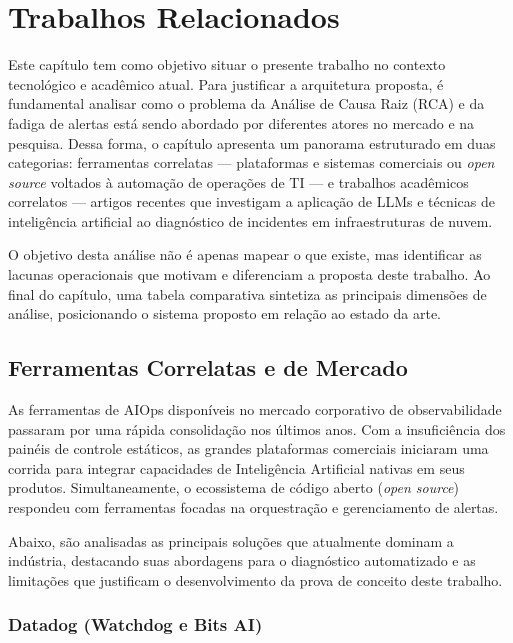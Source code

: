 \chapter{Trabalhos Relacionados}
\label{chap:trabalhos_relacionados}

Este capítulo tem como objetivo situar o presente trabalho no contexto tecnológico e acadêmico atual. Para justificar a arquitetura proposta, é fundamental analisar como o problema da Análise de Causa Raiz (RCA) e da fadiga de alertas está sendo abordado por diferentes atores no mercado e na pesquisa. Dessa forma, o capítulo apresenta um panorama estruturado em duas categorias: ferramentas correlatas --- plataformas e sistemas comerciais ou \textit{open source} voltados à automação de operações de TI --- e trabalhos acadêmicos correlatos --- artigos recentes que investigam a aplicação de LLMs e técnicas de inteligência artificial ao diagnóstico de incidentes em infraestruturas de nuvem.

O objetivo desta análise não é apenas mapear o que existe, mas identificar as lacunas operacionais que motivam e diferenciam a proposta deste trabalho. Ao final do capítulo, uma tabela comparativa sintetiza as principais dimensões de análise, posicionando o sistema proposto em relação ao estado da arte.

\section{Ferramentas Correlatas e de Mercado}
\label{sec:ferramentas_correlatas}

As ferramentas de AIOps disponíveis no mercado corporativo de observabilidade passaram por uma rápida consolidação nos últimos anos. Com a insuficiência dos painéis de controle estáticos, as grandes plataformas comerciais iniciaram uma corrida para integrar capacidades de Inteligência Artificial nativas em seus produtos. Simultaneamente, o ecossistema de código aberto (\textit{open source}) respondeu com ferramentas focadas na orquestração e gerenciamento de alertas.

Abaixo, são analisadas as principais soluções que atualmente dominam a indústria, destacando suas abordagens para o diagnóstico automatizado e as limitações que justificam o desenvolvimento da prova de conceito deste trabalho.

\subsection{Datadog (Watchdog e Bits AI)}

